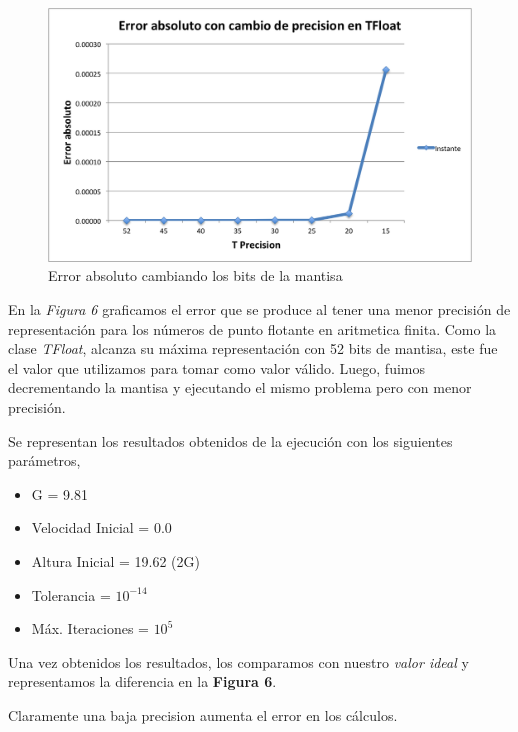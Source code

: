 \documentclass[a4paper]{article}
\begin{document}
\begin{figure}[H]
  \centering
  \includegraphics[scale=0.75]{graficos/6-errorAbsoluto.png}
  \caption{Error absoluto cambiando los bits de la mantisa }
\end{figure}

En la \textit{Figura 6} graficamos el error que se produce al tener una menor precisión de representación para los números de punto flotante en aritmetica finita. 
Como la clase \textit{TFloat}, alcanza su máxima representación con 52 bits de mantisa, este fue el valor que utilizamos para tomar como valor válido. Luego, fuimos decrementando la mantisa y ejecutando el mismo problema pero con menor precisión.

Se representan los resultados obtenidos de la ejecución con los siguientes parámetros, 
\begin{itemize}
  \item{G = 9.81}
  \item{Velocidad Inicial = 0.0} 
  \item{Altura Inicial = 19.62 (2G)} 
  \item{Tolerancia = $10^{-14}$} 
  \item{Máx. Iteraciones = $10^5$}
\end{itemize}

Una vez obtenidos los resultados, los comparamos con nuestro \textit{valor ideal} y representamos la diferencia en la \textbf{Figura 6}.


Claramente una baja precision aumenta el error en los cálculos.


\newpage
\end{document}
